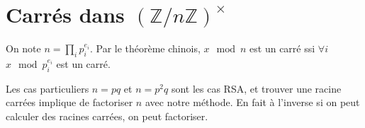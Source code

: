 \documentclass[a4paper,12pt]{book}
\newcommand{\Z}{\mathbb{Z}}
\theoremstyle{plain}
\theoremstyle{definition}
\theoremstyle{remark}
\begin{document}
\section{Carrés dans $(\Z/n\Z)^{\times}$}
On note $n=\prod_i p_i^{e_i}$. Par le théorème chinois, $x\mod n$ est
un carré ssi $\forall i$ $x\mod p_i^{e_i}$ est un carré. 

Les cas particuliers $n=pq$ et $n=p^2q$ sont les cas RSA, et trouver
une racine carrées implique de factoriser $n$ avec notre méthode. En
fait à l'inverse si on peut calculer des racines carrées, on peut 
factoriser.

\printbibliography
\end{document}

